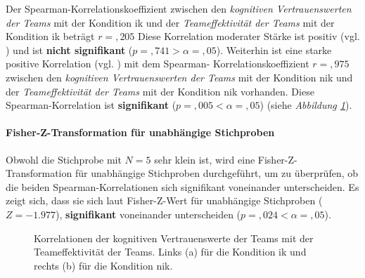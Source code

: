\documentclass[a4paper,11pt]{article}%
\renewcommand{\\}{\vspace*{0.5\baselineskip} \newline}
\begin{document}
{Der Spearman-Korrelationskoeffizient zwischen den \textit{kognitiven Vertrauenswerten der Teams} mit der Kondition \ac{ik} und der \textit{Teameffektivität der Teams} mit der Kondition \ac{ik} beträgt $r =,205$ Diese Korrelation moderater Stärke ist positiv (vgl. \citep[S. 77-81]{cohen2013statistical}) und ist \textbf{nicht signifikant} ($p =,741 > \alpha = ,05$). \\
Weiterhin ist eine starke positive Korrelation (vgl. \citep[S. 77-81]{cohen2013statistical}) mit dem Spearman- Korrelationskoeffizient $r =,975$ zwischen den \textit{kognitiven Vertrauenswerten der Teams} mit der Kondition \newline \ac{nik} und der \textit{Teameffektivität der Teams} mit der Kondition \ac{nik} vorhanden. Diese Spearman-Korrelation ist \textbf{signifikant} ($p =,005 < \alpha = ,05$) (siehe \textit{Abbildung \ref{H3_Korrelation_Auswertung}}).

\paragraph{Fisher-Z-Transformation für unabhängige Stichproben}
Obwohl die Stichprobe mit $N=5$ sehr klein ist, wird eine Fisher-Z-Transformation für unabhängige Stichproben durchgeführt, um zu überprüfen, ob die beiden Spearman-Korrelationen sich signifikant voneinander unterscheiden.
Es zeigt sich, dass sie sich laut Fisher-Z-Wert für unabhängige Stichproben ($Z=-1.977$), \textbf{signifikant} voneinander unterscheiden ($p =,024 < \alpha = ,05$).

\begin{figure}[h]
  \centering
  \qquad
  \caption[Korrelationen der kognitiven Vertrauenswerte der Teams mit der Teameffektivität der Teams]{Korrelationen der kognitiven Vertrauenswerte der Teams mit der Teameffektivität der Teams. Links (a) für die Kondition \ac{ik} und rechts (b) für die Kondition \ac{nik}.}
  \label{H3_Korrelation_Auswertung}
\end{figure}

}
\end{document}
